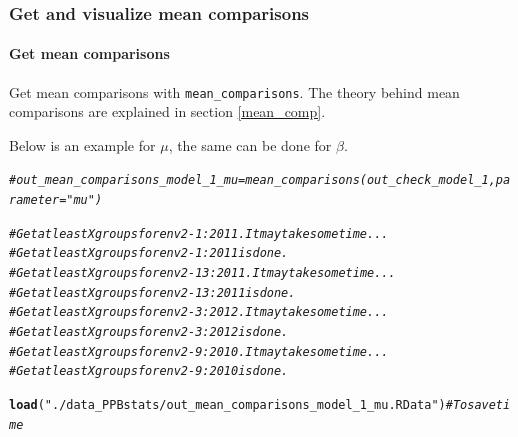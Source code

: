 \documentclass{book}\usepackage[]{graphicx}\usepackage[]{color}
\makeatletter
\newcommand{\hlstr}[1]{\textcolor[rgb]{0.192,0.494,0.8}{#1}}%
\newcommand{\hlcom}[1]{\textcolor[rgb]{0.678,0.584,0.686}{\textit{#1}}}%
\newcommand{\hlstd}[1]{\textcolor[rgb]{0.345,0.345,0.345}{#1}}%
\newcommand{\hlkwd}[1]{\textcolor[rgb]{0.737,0.353,0.396}{\textbf{#1}}}%
\newenvironment{kframe}{%
 \def\at@end@of@kframe{}%
 \ifinner\ifhmode%
  \def\at@end@of@kframe{\end{minipage}}%
  \begin{minipage}{\columnwidth}%
 \fi\fi%
 \def\FrameCommand##1{\hskip\@totalleftmargin \hskip-\fboxsep
 \colorbox{shadecolor}{##1}\hskip-\fboxsep
     \hskip-\linewidth \hskip-\@totalleftmargin \hskip\columnwidth}%
 \MakeFramed {\advance\hsize-\width
   \@totalleftmargin\z@ \linewidth\hsize
   \@setminipage}}%
 {\par\unskip\endMakeFramed%
 \at@end@of@kframe}
\newenvironment{knitrout}{}{} %
\makeatother
\begin{document}
\subsubsection{Get and visualize mean comparisons}

\paragraph{Get mean comparisons}

Get mean comparisons with \texttt{mean\_comparisons}.
The theory behind mean comparisons are explained in section \ref{mean_comp}.

Below is an example for $\mu$, the same can be done for $\beta$.

\begin{knitrout}
\color{fgcolor}\begin{kframe}
\begin{alltt}
\hlcom{# out_mean_comparisons_model_1_mu = mean_comparisons(out_check_model_1, parameter = "mu")}

\hlcom{# Get at least X groups for env2-1:2011. It may take some time ...}
\hlcom{# Get at least X groups for env2-1:2011 is done.}
\hlcom{# Get at least X groups for env2-13:2011. It may take some time ...}
\hlcom{# Get at least X groups for env2-13:2011 is done.}
\hlcom{# Get at least X groups for env2-3:2012. It may take some time ...}
\hlcom{# Get at least X groups for env2-3:2012 is done.}
\hlcom{# Get at least X groups for env2-9:2010. It may take some time ...}
\hlcom{# Get at least X groups for env2-9:2010 is done.}

\hlkwd{load}\hlstd{(}\hlstr{"./data_PPBstats/out_mean_comparisons_model_1_mu.RData"}\hlstd{)} \hlcom{# To save time}
\end{alltt}
\end{kframe}
\end{knitrout}
\end{document}
